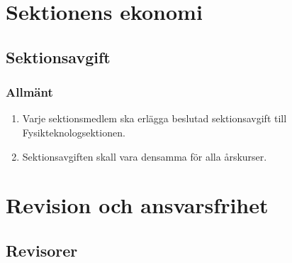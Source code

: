 \documentclass[11pt,a4paper]{article}
\begin{document}
\newpage



\newpage


\section{Sektionens ekonomi}
\subsection{Sektionsavgift}

\subsubsection{Allmänt}

\begin{enumerate}[\thesubsection .1]

  \item Varje sektionsmedlem ska erlägga beslutad sektionsavgift till
  Fysikteknologsektionen.

  \item Sektionsavgiften skall vara densamma för alla årskurser.

\end{enumerate}

\newpage



\section{Revision och ansvarsfrihet}

\subsection{Revisorer}
\end{document}
